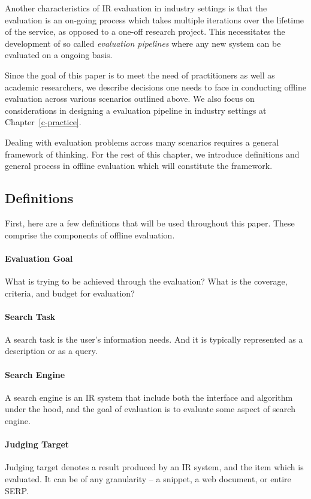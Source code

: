 Another characteristics of IR evaluation in industry settings is that the evaluation is an on-going process which takes multiple iterations over the lifetime of the service, as opposed to a one-off research project. This necessitates the development of so called \textit{evaluation pipelines} where any new system can be evaluated on a ongoing basis.

Since the goal of this paper is to meet the need of practitioners as well as academic researchers, we describe decisions one needs to face in conducting offline evaluation across various scenarios outlined above. We also focus on considerations in designing a evaluation pipeline in industry settings at Chapter~\ref{c-practice}.

Dealing with evaluation problems across many scenarios requires a general framework of thinking. For the rest of this chapter, we introduce definitions and general process in offline evaluation which will constitute the framework.

\subsection{Definitions}

First, here are a few definitions that will be used throughout this paper. These comprise the components of offline evaluation.

\paragraph{Evaluation Goal} What is trying to be achieved through the evaluation? What is the coverage, criteria, and budget for evaluation?

\paragraph{Search Task}  A search task is the user's information needs. And it is typically represented as a description or as a query.

\paragraph{Search Engine} A search engine is an IR system that include both the interface and algorithm under the hood, and the goal of evaluation is to evaluate some aspect of search engine.

\paragraph{Judging Target} Judging target denotes a result produced by an IR system, and the item which is evaluated. It can be of any granularity -- a snippet, a web document, or entire SERP. 

